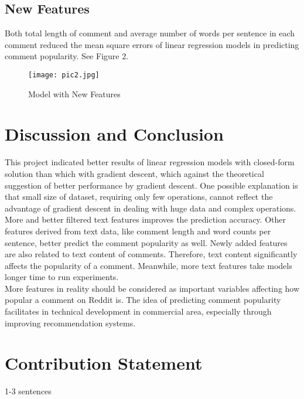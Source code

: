 \documentclass[12pt]{article}
\begin{document}
\subsection*{New Features}
Both total length of comment and average number of words per sentence in each comment reduced the mean square errors of linear regression models in predicting comment popularity. See Figure 2.

\begin{figure}[h]
\centering
\texttt{[image: pic2.jpg]}
\caption{Model with New Features}
\label{fig: fig2}
\end{figure}

\section*{Discussion and Conclusion}
This project indicated better results of linear regression models with closed-form solution than which with gradient descent, which against the theoretical suggestion of better performance by gradient descent. One possible explanation is that small size of dataset, requiring only few operations, cannot reflect the advantage of gradient descent in dealing with huge data and complex operations.\\

More and better filtered text features improves the prediction accuracy. Other features derived from text data, like comment length and word counts per sentence, better predict the comment popularity as well. Newly added features are also related to text content of comments. Therefore, text content significantly affects the popularity of a comment. Meanwhile, more text features take models longer time to run experiments.\\

More features in reality should be considered as important variables affecting how popular a comment on Reddit is. The idea of predicting comment popularity facilitates in technical development in commercial area, especially through improving recommendation systems.

\printbibliography

\newpage
\section*{Contribution Statement}
1-3 sentences
\end{document}
